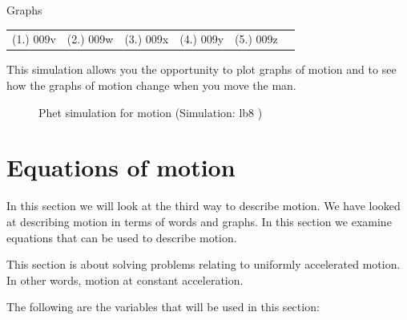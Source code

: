 \begin{exercises}{Graphs }
\par \practiceinfo
 \par \begin{tabular}[h]{cccccc}
 (1.) 009v  &  (2.) 009w  &  (3.) 009x  &  (4.) 009y  &  (5.) 009z  & \end{tabular}
\end{exercises}
\label{m38795*eip-842}This simulation allows you the opportunity to plot graphs of motion and to see how the graphs of motion change when you move the man.
    \setcounter{subfigure}{0}
	\begin{figure}[H] %
    \textnormal{Phet simulation for motion}\nopagebreak
  \label{m38806*phet!!!underscore!!!sim}\label{m38806*phet-simulation}
             { (Simulation:  lb8 )}
 \end{figure}           \par 
  \label{m38795**end}
         \section{Equations of motion}
    \nopagebreak
      \label{m38796*id75595}In this section we will look at the third way to describe motion. We have looked at describing motion in terms of words and graphs. In this section we examine equations that can be used to describe motion.\par 
      \label{m38796*id75600}This section is about solving problems relating to uniformly accelerated motion. In other words, motion at constant acceleration.\par 
      \label{m38796*id75605}The following are the variables that will be used in this section:

